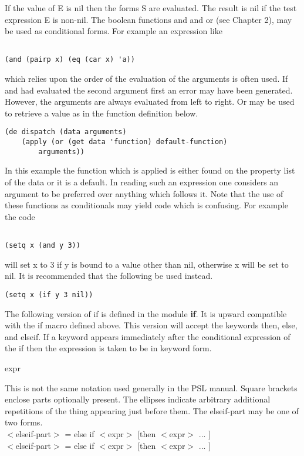{   If the value of E is nil then the  forms  S  are  evaluated.
    The result is nil if the test expression E is non-nil.}
  		The boolean functions and and or (see Chapter 2), may be used
				as conditional forms.  For example an expression like
\begin{verbatim}

(and (pairp x) (eq (car x) 'a))

\end{verbatim}
which relies upon the order of the evaluation of  the  arguments
is  often  used.  If and had evaluated the second argument first
an error may have been generated.  However,  the  arguments  are
always evaluated from left to right.  Or may be used to retrieve
a value as in the function definition below.
\begin{verbatim}
(de dispatch (data arguments)
	(apply (or (get data 'function) default-function)
		arguments))
\end{verbatim}
  In  this example the function which is applied is either found
on the property list of the data or it is a default.  In reading
such an expression one considers an  argument  to  be  preferred
over  anything  which  follows  it.   Note that the use of these
functions as conditionals may yield  code  which  is  confusing.
For example the code
\begin{verbatim}

(setq x (and y 3))

\end{verbatim}
will  set  x  to  3  if  y  is  bound to a value other than nil,
otherwise x will be set to nil.   It  is  recommended  that  the
following be used instead.
\begin{verbatim}
(setq x (if y 3 nil))
\end{verbatim}
  The  following  version of if is defined in the module {\bf if}. It
is upward compatible with the if  macro  defined  above. This
version  will  accept the keywords then, else, and elseif. If a
keyword appears immediately after the conditional expression of
the if then the expression is taken to be in keyword form.

    {expr}

    {This  is  not  the  same  notation used generally in the PSL
    manual.  Square brackets enclose parts  optionally  present.
    The  ellipses  indicate  arbitrary additional repetitions of
    the thing appearing just before them.  The  elseif-part  may
    be one of two forms.\\
$<$elseif-part$>$ = else if $<$expr$>$ [then $<$expr$>$ ... ]\\
$<$elseif-part$>$ = else if $<$expr$>$ [then $<$expr$>$ ... ]
}

